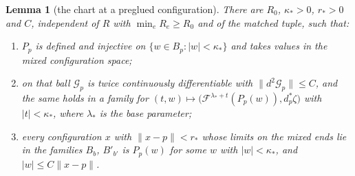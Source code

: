 \documentclass[11pt]{amsart}
\newtheorem{lemma}[theorem]{Lemma}
\theoremstyle{definition}
\theoremstyle{remark}
\theoremstyle{plain}
\numberwithin{equation}{section}
\begin{document}
\begin{lemma}[the chart at a preglued configuration]\label{lem:neck-chart}
There are $R_0$, $\kappa_*>0$, $r_*>0$ and $C$, independent of $R$ with
$\min_eR_e\ge R_0$ and of the matched tuple, such that:
\begin{enumerate}[label=(\alph*)]
\item $P_p$ is defined and injective on $\{w\in B_p:|w|<\kappa_*\}$ and takes
  values in the mixed configuration space;
\item on that ball $\mathcal G_p$ is twice continuously differentiable with
  $\|d^2\mathcal G_p\|\le C$, and the same holds in a family for
  $(t,w)\mapsto\bigl(\mathcal F^{\lambda_*+t}(P_p(w)),d_p^*\zeta\bigr)$ with
  $|t|<\kappa_*$, where $\lambda_*$ is the base parameter;
\item every configuration $x$ with $\|x-p\|<r_*$ whose limits on the mixed
  ends lie in the families $B_b$, $B'_{b'}$ is $P_p(w)$ for some $w$ with
  $|w|<\kappa_*$, and $|w|\le C\|x-p\|$.
\end{enumerate}
\end{lemma}
\end{document}
